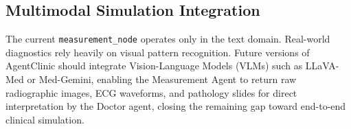 \subsection{Multimodal Simulation Integration}

The current \texttt{measurement\_node} operates only in the text domain. Real-world diagnostics rely heavily on visual pattern recognition. Future versions of AgentClinic should integrate Vision-Language Models (VLMs) such as LLaVA-Med or Med-Gemini, enabling the Measurement Agent to return raw radiographic images, ECG waveforms, and pathology slides for direct interpretation by the Doctor agent, closing the remaining gap toward end-to-end clinical simulation.
